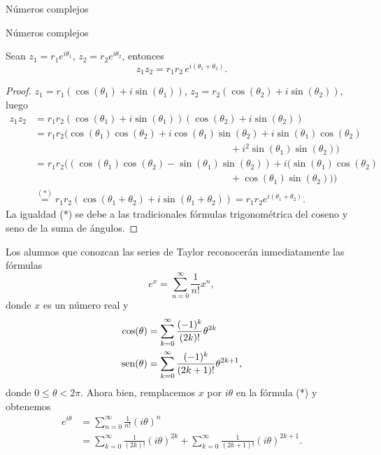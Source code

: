 \begin{chapter}{N\'umeros complejos}
\begin{section}{N\'umeros complejos}
    \begin{proposicion}
        Sean $z_1 = r_1 e^{i\theta_1}$, $z_2 = r_2 e^{i\theta_2}$,  entonces
        $$
            z_1 z_2 =  r_1r_2 \,e^{i(\theta_1+ \theta_2)}.
        $$
    \end{proposicion}
    \begin{proof}
        $z_1 = r_1(\cos(\theta_1)+i\sin(\theta_1))$, $z_2 = r_2(\cos(\theta_2)+i\sin(\theta_2))$, luego
        \begin{align*}
            z_1z_2 & = r_1r_2(\cos(\theta_1)+i\sin(\theta_1))(\cos(\theta_2)+i\sin(\theta_2))                                      \\
                & = r_1r_2(\cos(\theta_1)\cos(\theta_2)+i\cos(\theta_1)\sin(\theta_2)+i\sin(\theta_1)\cos(\theta_2)             \\
                & \qquad\qquad\qquad\qquad\qquad\qquad\qquad\qquad\qquad\qquad+i^2\sin(\theta_1)\sin(\theta_2))                 \\
                & = r_1r_2((\cos(\theta_1)\cos(\theta_2)-\sin(\theta_1)\sin(\theta_2))+i(\sin(\theta_1)\cos(\theta_2)           \\
                & \qquad\qquad\qquad\qquad\qquad\qquad\qquad\qquad \qquad\qquad +\cos(\theta_1)\sin(\theta_2)))                 \\
                & \overset{(*)}= r_1r_2(\cos(\theta_1+\theta_2) + i\sin(\theta_1+\theta_2)) =  r_1r_2e^{i(\theta_1+ \theta_2)}.
        \end{align*}
        La igualdad ($*$) se debe a las tradicionales fórmulas trigonométrica del coseno y  seno de la suma de ángulos.
    \end{proof}


    \begin{observacion*} Los alumnos que conozcan las series de Taylor reconocerán inmediatamente las fórmulas
        \begin{equation*}
            e^x = \sum_{n=0}^{\infty} \frac{1}{n!}x^n, \tag{*}
        \end{equation*}
        donde $x$ es un número real y
        \begin{align*}
            \cos(\theta) & =  \sum_{k=0}^{\infty} \frac{(-1)^k}{(2k)!}\theta^{2k}       \\
            \operatorname{sen}(\theta) & = \sum_{k=0}^{\infty} \frac{ (-1)^k}{(2k+1)!}\theta^{2k+1} ,
        \end{align*}
        donde $0 \le \theta < 2\pi$. Ahora bien, remplacemos $x$ por $i\theta$ en la fórmula (*) y obtenemos
        \begin{align*}
            e^{i\theta} & = \sum_{n=0}^{\infty} \frac{1}{n!}(i\theta)^n \\
            & =  \sum_{k=0}^{\infty} \frac{1}{(2k)!}(i\theta)^{2k}  + \sum_{k=0}^{\infty} \frac{1}{(2k+1)!}(i\theta)^{2k+1}. \tag{**}
        \end{align*}


\end{observacion*}
\end{section}
\end{chapter}
